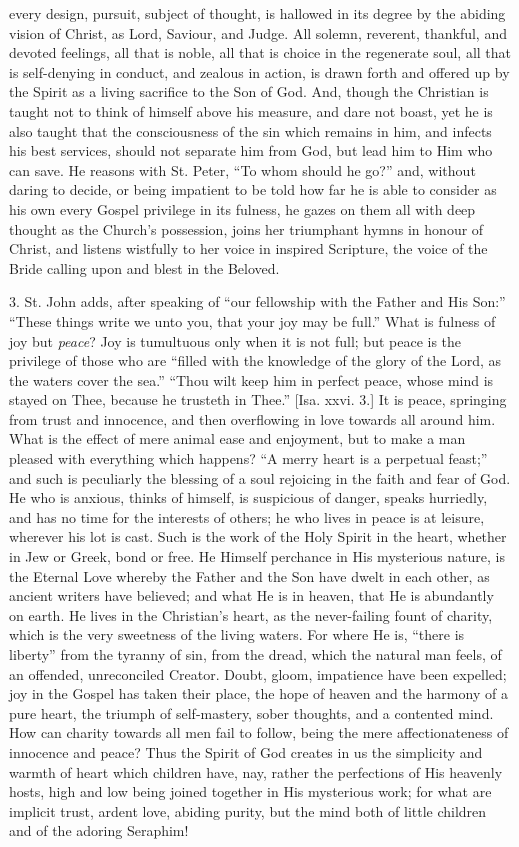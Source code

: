every design, pursuit, subject of thought, is hallowed in its degree by
the abiding vision of Christ, as Lord, Saviour, and Judge. All solemn,
reverent, thankful, and devoted feelings, all that is noble, all that is
choice in the regenerate soul, all that is self-denying in conduct, and
zealous in action, is drawn forth and offered up by the Spirit as a
living sacrifice to the Son of God. And, though the Christian is taught
not to think of himself above his measure, and dare not boast, yet he is
also taught that the consciousness of the sin which remains in him, and
infects his best services, should not separate him from God, but lead
him to Him who can save. He reasons with St. Peter, ``To whom should
he go?'' and, without daring to decide, or being impatient to be
told how far he is able to consider as his own every Gospel privilege in
its fulness, he gazes on them all with deep thought as the Church's
possession, joins her triumphant hymns in honour of Christ, and listens
wistfully to her voice in inspired Scripture, the voice of the Bride
calling upon and blest in the Beloved.

3. St. John adds, after speaking of ``our fellowship with the
Father and His Son:'' ``These things write we unto you, that
your joy may be full.'' What is fulness of joy but \emph{peace}? Joy
is tumultuous only when it is not full; but peace is the privilege of
those who are ``filled with the knowledge of the glory of the Lord,
as the waters cover the sea.'' ``Thou wilt keep him in perfect
peace, whose mind is stayed on Thee, because he trusteth in Thee.''
[Isa. xxvi. 3.] It is peace, springing from trust and innocence, and
then overflowing in love towards all around him. What is the effect of
mere animal ease and enjoyment, but to make a man pleased with
everything which happens? ``A merry heart is a perpetual
feast;'' and such is peculiarly the blessing of a soul rejoicing in
the faith and fear of God. He who is anxious, thinks of himself, is
suspicious of danger, speaks hurriedly, and has no time for the
interests of others; he who lives in peace is at leisure, wherever his
lot is cast. Such is the work of the Holy Spirit in the heart, whether
in Jew or Greek, bond or free. He Himself perchance in His mysterious
nature, is the Eternal Love whereby the Father and the Son have dwelt in
each other, as ancient writers have believed; and what He is in heaven,
that He is abundantly on earth. He lives in the Christian's heart, as
the never-failing fount of charity, which is the very sweetness of the
living waters. For where He is, ``there is liberty'' from the
tyranny of sin, from the dread, which the natural man feels, of an
offended, unreconciled Creator. Doubt, gloom, impatience have been
expelled; joy in the Gospel has taken their place, the hope of heaven
and the harmony of a pure heart, the triumph of self-mastery, sober
thoughts, and a contented mind. How can charity towards all men fail to
follow, being the mere affectionateness of innocence and peace? Thus the
Spirit of God creates in us the simplicity and warmth of heart which
children have, nay, rather the perfections of His heavenly hosts, high
and low being joined together in His mysterious work; for what are
implicit trust, ardent love, abiding purity, but the mind both of little
children and of the adoring Seraphim!

